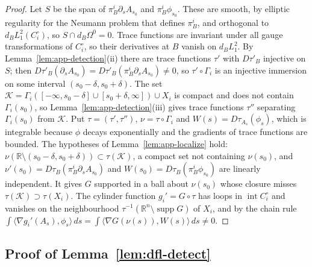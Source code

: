 \documentclass[11pt]{amsart}
\theoremstyle{definition}
\theoremstyle{remark}
\theoremstyle{plain}
\numberwithin{equation}{section}
\newcommand{\RR}{\mathbb{R}}
\begin{document}
\begin{proof}
Let $S$ be the span of $\pi^i_B\partial_sA_{s_0}$ and $\pi^i_B\phi_{s_0}$. These are smooth, by
elliptic regularity for the Neumann problem that defines $\pi^i_B$, and orthogonal to
$d_BL^2_1(C_i^\circ)$, so $S\cap d_B\Omega^0=0$. Trace functions are invariant under
all gauge transformations of $C_i^\circ$, so their derivatives at $B$ vanish on $d_BL^2_1$. By
Lemma~\ref{lem:app-detection}(ii) there are trace functions $\tau'$ with $D\tau'_B$ injective on
$S$; then $D\tau'_B(\partial_sA_{s_0})=D\tau'_B(\pi^i_B\partial_sA_{s_0})\ne0$, so $\tau'\circ\Gamma_i$
is an injective immersion on some interval $(s_0-\delta,s_0+\delta)$. The set
$\mathcal K=\Gamma_i([-\infty,s_0-\delta]\cup[s_0+\delta,\infty])\cup X_i$ is compact and does not
contain $\Gamma_i(s_0)$, so Lemma~\ref{lem:app-detection}(iii) gives trace functions $\tau''$
separating $\Gamma_i(s_0)$ from $\mathcal K$. Put $\tau=(\tau',\tau'')$, $\nu=\tau\circ\Gamma_i$ and
$W(s)=D\tau_{A_s}(\phi_s)$, which is integrable because $\phi$ decays exponentially and the
gradients of trace functions are bounded. The hypotheses of Lemma~\ref{lem:app-localize} hold:
$\nu(\RR\setminus(s_0-\delta,s_0+\delta))\subset\tau(\mathcal K)$, a compact set not containing
$\nu(s_0)$, and $\nu'(s_0)=D\tau_B(\pi^i_B\partial_sA_{s_0})$ and
$W(s_0)=D\tau_B(\pi^i_B\phi_{s_0})$ are linearly independent. It gives $G$ supported in a ball about
$\nu(s_0)$ whose closure misses $\tau(\mathcal K)\supset\tau(X_i)$. The cylinder function
$g_i'=G\circ\tau$ has loops in $\operatorname{int}C_i^\circ$ and vanishes on the neighbourhood
$\tau^{-1}(\RR^n\setminus\operatorname{supp}G)$ of $X_i$, and by the chain rule
$\int\langle\nabla g_i'(A_s),\phi_s\rangle\,ds=\int\langle\nabla G(\nu(s)),W(s)\rangle\,ds\ne0$.
\end{proof}

\subsection{Proof of Lemma~\ref{lem:dfl-detect}}\label{subsec:app-proof-lemma}
\end{document}
